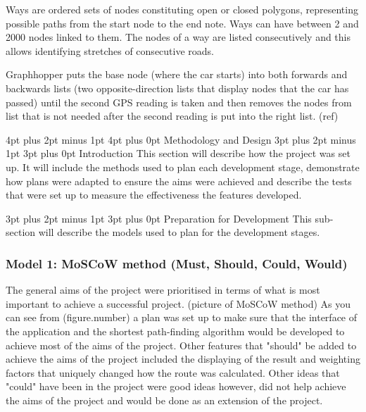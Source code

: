 \documentclass[12pt,a4paper]{article}
\makeatletter
\renewcommand\subsection{\@startsection {subsection}{1}{0mm} %
                               {3pt plus 2pt minus 1pt} %
                               {3pt plus 0pt} %
                               {\normalfont\bfseries}}
\renewcommand\section{\@startsection {section}{1}{0mm} %
                               {4pt plus 2pt minus 1pt} %
                               {4pt plus 0pt} %
                               {\Large\bfseries}}
\makeatother
\begin{document}
Ways are ordered sets of nodes constituting open or closed polygons, representing possible paths from the start node to the end note. Ways can have between 2 and 2000 nodes linked to them. The nodes of a way are listed consecutively and this allows identifying stretches of consecutive roads. \cite{OpenWiki} 



Graphhopper puts the base node (where the car starts) into both forwards and backwards lists (two opposite-direction lists that display nodes that the car has passed) until the second GPS reading is taken and then removes the nodes from list that is not needed after the second reading is put into the right list. (ref)

\newpage
\section{Methodology and Design}
\subsection{Introduction}
This section will describe how the project was set up. It will include the methods used to plan each development stage, demonstrate how plans were adapted to ensure the aims were achieved and describe the tests that were set up to measure the effectiveness the features developed.

\subsection{Preparation for Development}
This sub-section will describe the models used to plan for the development stages.

\subsubsection{Model 1: MoSCoW method (Must, Should, Could, Would)}
The general aims of the project were prioritised in terms of what is most important to achieve a successful project. (picture of MoSCoW method)
As you can see from (figure.number) a plan was set up to make sure that the interface of the application and the shortest path-finding algorithm would be developed to achieve most of the aims of the project. Other features that "should" be added to achieve the aims of the project included the displaying of the result and weighting factors that uniquely changed how the route was calculated. Other ideas that "could" have been in the project were good ideas however, did not help achieve the aims of the project and would be done as an extension of the project.
\end{document}
